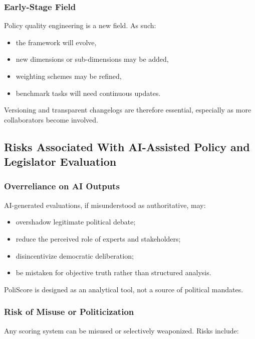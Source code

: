 \documentclass[12pt]{article}
\begin{document}
\subsubsection{Early-Stage Field}

Policy quality engineering is a new field. As such:

\begin{itemize}
    \item the framework will evolve,
    \item new dimensions or sub-dimensions may be added,
    \item weighting schemes may be refined,
    \item benchmark tasks will need continuous updates.
\end{itemize}

Versioning and transparent changelogs are therefore essential, especially as more collaborators become involved.

\subsection{Risks Associated With AI-Assisted Policy and Legislator Evaluation}

\subsubsection{Overreliance on AI Outputs}

AI-generated evaluations, if misunderstood as authoritative, may:

\begin{itemize}
    \item overshadow legitimate political debate;
    \item reduce the perceived role of experts and stakeholders;
    \item disincentivize democratic deliberation;
    \item be mistaken for objective truth rather than structured analysis.
\end{itemize}

PoliScore is designed as an analytical tool, not a source of political mandates.

\subsubsection{Risk of Misuse or Politicization}

Any scoring system can be misused or selectively weaponized. Risks include:
\end{document}
